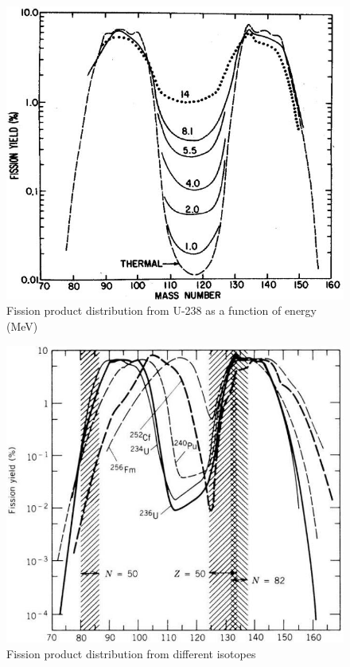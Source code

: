 \documentclass[12pt]{article}
\begin{document}
\begin{figure}
\centering
\includegraphics[scale=0.7]{../figs/FP_energy}
\caption{Fission product distribution from U-238 as a function of energy (MeV)}
\label{fig:fp-e}
\end{figure}
\begin{figure}
\centering
\includegraphics[scale=0.7]{../figs/FP_Isotope}
\caption{Fission product distribution from different isotopes}
\label{fig:fp-i}
\end{figure}
\end{document}
